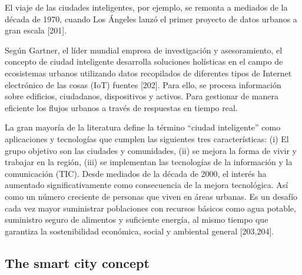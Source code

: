 \documentclass[a4paper,fleqn,spanish]{cas-dc}
\begin{document}

El viaje de las ciudades inteligentes, por ejemplo, se remonta a
mediados de la década de 1970, cuando Los Ángeles lanzó el primer proyecto de
datos urbanos a gran escala [201].

Según Gartner, el líder mundial empresa de
investigación y asesoramiento, el concepto de ciudad inteligente desarrolla
soluciones holísticas en el campo de ecosistemas urbanos utilizando datos
recopilados de diferentes tipos de Internet electrónico de las cosas (IoT)
fuentes [202]. Para ello, se procesa información sobre edificios, ciudadanos,
dispositivos y activos. 
Para gestionar de manera eficiente los flujos urbanos
a través de respuestas en tiempo real.

La gran mayoría de la literatura define la término “ciudad inteligente” como
aplicaciones y tecnologías que cumplen las siguientes tres características: (i)
El grupo objetivo son las ciudades y comunidades, (ii) se mejora la forma de
vivir y trabajar en la región, (iii) se implementan las tecnologías de la
información y la comunicación (TIC).
Desde mediados de la década de 2000, el interés ha aumentado significativamente
como consecuencia de la mejora tecnológica. Así como un número creciente de
personas que viven en áreas urbanas. Es un desafío cada vez mayor suministrar
poblaciones con recursos básicos como agua potable, suministro seguro de
alimentos y suficiente energía, al mismo tiempo que garantiza la sostenibilidad
económica, social y ambiental general [203,204].




\subsection{The smart city concept}\label{concepto}
\end{document}
